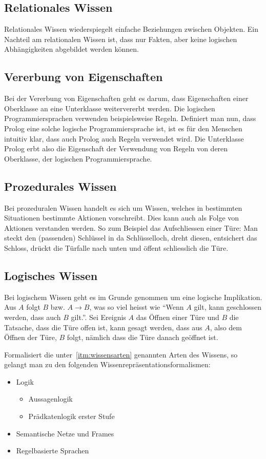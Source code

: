 \subsection{Relationales Wissen}
\label{subsec:relationales_wissen}
Relationales Wissen wiederspiegelt einfache Beziehungen zwischen Objekten. Ein Nachteil am relationalen Wissen ist, dass nur Fakten, aber keine logischen Abhängigkeiten abgebildet werden können.

\subsection{Vererbung von Eigenschaften}
\label{subsec:vererbung_eigenschaft}
Bei der Vererbung von Eigenschaften geht es darum, dass Eigenschaften einer Oberklasse an eine Unterklasse weitervererbt werden. Die logischen Programmiersprachen verwenden beispielsweise Regeln. Definiert man nun, dass Prolog eine solche logische Programmiersprache ist, ist es für den Menschen intuitiv klar, dass auch Prolog auch Regeln verwendet wird. Die Unterklasse Prolog erbt also die Eigenschaft der Verwendung von Regeln von deren Oberklasse, der logischen Programmiersprache.

\subsection{Prozedurales Wissen}
\label{subsec:prozedurales_wissen}
Bei prozeduralen Wissen handelt es sich um Wissen, welches in bestimmten Situationen bestimmte Aktionen vorschreibt. Dies kann auch als Folge von Aktionen verstanden werden. So zum Beispiel das Aufschliessen einer Türe: Man steckt den (passenden) Schlüssel in da Schlüsselloch, dreht diesen, entsichert das Schloss, drückt die Türfalle nach unten und öffent schliesslich die Türe.

\subsection{Logisches Wissen}
\label{subsec:logisches_wissen}
Bei logischem Wissen geht es im Grunde genommen um eine logische Implikation. Aus $A$ folgt $B$ bzw. $A \to B$, was so viel heisst wie ``Wenn $A$ gilt, kann geschlossen werden, dass auch $B$ gilt.''. Sei Ereignis $A$ das Öffnen einer Türe und $B$ die Tatsache, dass die Türe offen ist, kann gesagt werden, dass aus $A$, also dem Öffnen der Türe, $B$ folgt, nämlich dass die Türe danach geöffnet ist.

Formalisiert die unter~\ref{itm:wissensarten} genannten Arten des Wissens, so gelangt man zu den folgenden Wissenrepräsentationsformalismen:
\begin{itemize}
    \item Logik
        \begin{itemize}
            \item Aussagenlogik
            \item Prädkatenlogik erster Stufe
        \end{itemize}
    \item Semantische Netze und Frames
    \item Regelbasierte Sprachen
\end{itemize}

